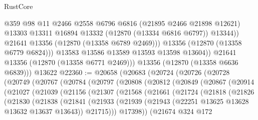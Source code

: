 \begin{lexlean}{RustCore}
\begin{coremodule}
                    @359
                    @98
                    @11
                    @2466
                    @2558
                    @6796
                    @6816
                    (@21895 @2466 @21898 @12621)
                    @13303
                    @13311
                    @16894
                    @13332
                    (@12870 (@13334 @6816 @6797))
                    @13344))
                @21641
                @13356
                (@12870 (@13358 @6789 @2469)))
              @13356
              (@12870 (@13358 @6779 @6824)))
            @13583
            @13586
            @13589
            @13593
            @13598
            @13604))
        @21641
        @13356
        (@12870 (@13358 @6771 @2469)))
      @13356
      (@12870 (@13358 @6636 @6839)))
    @13622
@22360 := @20658
    (@20683
      (@20724
        (@20726
          (@20728
            (@20749
              (@20767
                (@20784
                  (@20797
                    (@20808
                      (@20812
                        (@20849
                          (@20867
                            (@20914
                              (@21027
                                (@21039
                                  (@21156
                                    (@21307
                                      (@21568
                                        (@21661
                                          (@21724
                                            (@21818
                                              (@21826
                                                (@21830
                                                  (@21838
                                                    (@21841
                                                      (@21933
                                                        (@21939
                                                          (@21943
                                                            (@22251
                                                              @13625
                                                              @13628
                                                              @13632
                                                              @13637
                                                              @13643))
                                                          @21715)))
                                                    @17398))
                                                (@21674
                                                  @324
                                                  @172

\end{coremodule}
\end{lexlean}
